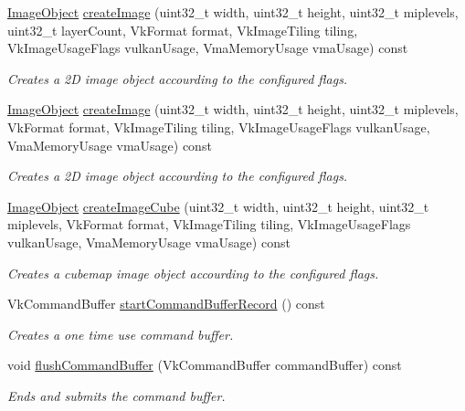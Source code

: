 \begin{DoxyCompactItemize}
\hyperlink{structblaze_1_1ImageObject}{Image\+Object} \hyperlink{classblaze_1_1Context_a9598d5324134f5dcbcc0850fa5f928f8}{create\+Image} (uint32\+\_\+t width, uint32\+\_\+t height, uint32\+\_\+t miplevels, uint32\+\_\+t layer\+Count, Vk\+Format format, Vk\+Image\+Tiling tiling, Vk\+Image\+Usage\+Flags vulkan\+Usage, Vma\+Memory\+Usage vma\+Usage) const
\begin{DoxyCompactList}\small\item\em Creates a 2D image object accourding to the configured flags. \end{DoxyCompactList}\item 
\hyperlink{structblaze_1_1ImageObject}{Image\+Object} \hyperlink{classblaze_1_1Context_adecff6f1105733085198f877aa04e78f}{create\+Image} (uint32\+\_\+t width, uint32\+\_\+t height, uint32\+\_\+t miplevels, Vk\+Format format, Vk\+Image\+Tiling tiling, Vk\+Image\+Usage\+Flags vulkan\+Usage, Vma\+Memory\+Usage vma\+Usage) const
\begin{DoxyCompactList}\small\item\em Creates a 2D image object accourding to the configured flags. \end{DoxyCompactList}\item 
\hyperlink{structblaze_1_1ImageObject}{Image\+Object} \hyperlink{classblaze_1_1Context_a6993c0feaa2520878daab38851defb17}{create\+Image\+Cube} (uint32\+\_\+t width, uint32\+\_\+t height, uint32\+\_\+t miplevels, Vk\+Format format, Vk\+Image\+Tiling tiling, Vk\+Image\+Usage\+Flags vulkan\+Usage, Vma\+Memory\+Usage vma\+Usage) const
\begin{DoxyCompactList}\small\item\em Creates a cubemap image object accourding to the configured flags. \end{DoxyCompactList}\item 
Vk\+Command\+Buffer \hyperlink{classblaze_1_1Context_a83e1d5636e7646afa92f1ed41608e25f}{start\+Command\+Buffer\+Record} () const
\begin{DoxyCompactList}\small\item\em Creates a one time use command buffer. \end{DoxyCompactList}\item 
void \hyperlink{classblaze_1_1Context_ac550896c0106808453f04f9cda9887b0}{flush\+Command\+Buffer} (Vk\+Command\+Buffer command\+Buffer) const
\begin{DoxyCompactList}\small\item\em Ends and submits the command buffer. \end{DoxyCompactList}\end{DoxyCompactItemize}
